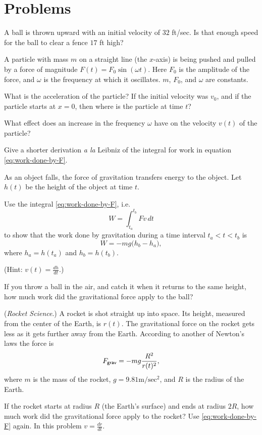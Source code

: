 \section{Problems}
\problemfont
\begin{multicols}{2}

\problem A ball is thrown upward with an initial velocity of $32$ ft/sec. Is
that enough speed for the ball to clear a fence $17$ ft high?

\problem A particle with mass $m$ on a straight line (the $x$-axis) is being
pushed and pulled by a force of magnitude $F(t) = F_0 \sin (\omega t)$.  Here
$F_0$ is the amplitude of the force, and $\omega$ is the frequency at which it
oscillates.  $m$, $F_0$, and $\omega$ are constants.

\subprob What is the acceleration of the particle?
If the initial velocity was $v_0$, and if the particle starts at $x=0$, then where is
the particle at time $t$?

\subprob What effect does an increase in the frequency $\omega$ have on the
velocity $v(t)$ of the particle?

\problem Give a shorter derivation \textit{a la } Leibniz of the integral for
work in equation \eqref{eq:work-done-by-F}.

\problem As an object falls, the force of gravitation transfers energy to the
object.  Let $h(t)$ be the height of the object at time $t$.  

\subprob Use the integral \eqref{eq:work-done-by-F}, i.e.
\[
  W = \int_{t_a}^{t_b} Fv\,dt
\]
to show that the work done by gravitation during a time interval $t_a < t< t_b$
is
\[
  W = -mg\bigl(h_b - h_a\bigr),
\]
where $h_a = h(t_a)$ and $h_b = h(t_b)$.

(Hint:  $v(t) = \frac{dh}{dt}$.)

\subprob If you throw a ball in the air, and catch it when it returns to the
same height, how much work did the gravitational force apply to the ball?

\problem (\textit{Rocket Science}.)
A rocket is shot straight up into space.  Its height, measured from the
center of the Earth, is $r(t)$.  The gravitational force on the rocket gets less
as it gets further away from the Earth.  According to another of Newton's laws
the force is
\[
  F_{\sf grav} = -mg \frac{R^2}{r(t)^2},
\]
where $m$ is the mass of the rocket, $g=9.81\textrm{m}/\textrm{sec}^2$, and
$R$ is the radius of the Earth.

If the rocket starts at radius $R$ (the Earth's surface) and ends at radius
$2R$, how much work did the gravitational force apply to the rocket?
Use \eqref{eq:work-done-by-F} again.  In this problem $v = \frac{dr}{dt}$.

\begin{center}
  
\end{center}

\end{multicols}



